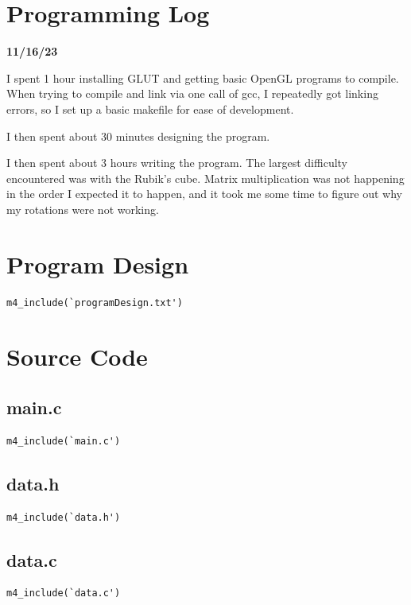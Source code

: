 \documentclass[12pt]{article}
\begin{document}
\section{Programming Log}

\noindent\textbf{11/16/23}

I spent 1 hour installing GLUT and getting basic OpenGL programs to compile.
When trying to compile and link via one call of gcc, I repeatedly got linking errors,
so I set up a basic makefile for ease of development.

I then spent about 30 minutes designing the program.

I then spent about 3 hours writing the program. The largest difficulty encountered was with the
Rubik's cube. Matrix multiplication was not happening in the order I expected it to happen,
and it took me some time to figure out why my rotations were not working.


\section{Program Design}

\begin{verbatim}
m4_include(`programDesign.txt')
\end{verbatim}

\section{Source Code}

\subsection{main.c}
\begin{verbatim}
m4_include(`main.c')
\end{verbatim}

\subsection{data.h}
\begin{verbatim}
m4_include(`data.h')
\end{verbatim}
\subsection{data.c}
\begin{verbatim}
m4_include(`data.c')
\end{verbatim}
\end{document}
